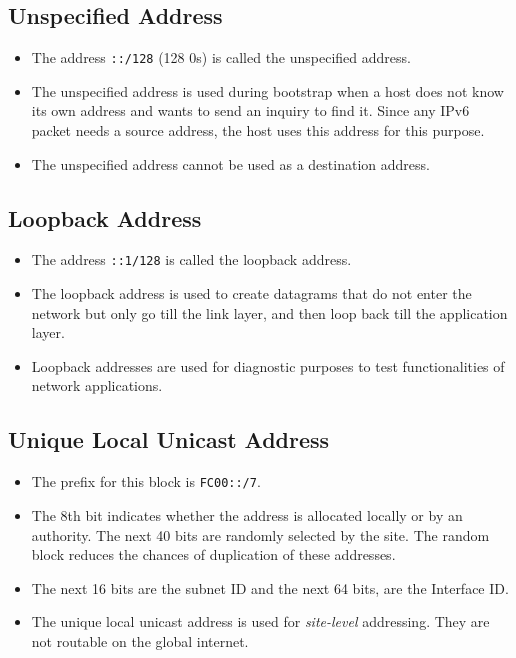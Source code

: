 \documentclass[a4paper]{article}
\theoremstyle{plain}
\theoremstyle{definition}
\begin{document}
\subsection{Unspecified Address}
\begin{itemize}
    \item The address \texttt{::/128} (128 0s) is called the unspecified address.
    
    \item The unspecified address is used during bootstrap when a host does not know its own address and wants to send an inquiry to find it. Since any IPv6 packet needs a source address, the host uses this address for this purpose.
    
    \item The unspecified address cannot be used as a destination address.
\end{itemize}

\subsection{Loopback Address}
\begin{itemize}
    \item The address \texttt{::1/128} is called the loopback address.
    
    \item The loopback address is used to create datagrams that do not enter the network but only go till the link layer, and then loop back till the application layer. 
    
    \item Loopback addresses are used for diagnostic purposes to test functionalities of network applications. 
\end{itemize}

\subsection{Unique Local Unicast Address}
\begin{itemize}
    \item The prefix for this block is \texttt{FC00::/7}.
    
    \item The 8th bit indicates whether the address is allocated locally or by an authority. The next 40 bits are randomly selected by the site. The random block reduces the chances of duplication of these addresses.
    
    \item The next 16 bits are the subnet ID and the next 64 bits, are the Interface ID. 
    
    \item The unique local unicast address is used for \textit{site-level} addressing. They are not routable on the global internet. 
\end{itemize}
\end{document}
